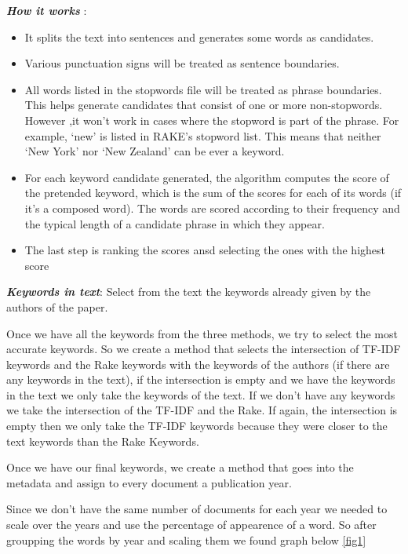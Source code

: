 \documentclass[article,twocolumn]{IEEEtran}
\providecommand{\tightlist}{%
      \setlength{\itemsep}{0pt}\setlength{\parskip}{0pt}}
\begin{document}
\textbf{\emph{How it works}} :

\begin{itemize}
\tightlist
\item
  It splits the text into sentences and generates some words as
  candidates.\\
\item
  Various punctuation signs will be treated as sentence boundaries.
\item
  All words listed in the stopwords file will be treated as phrase
  boundaries. This helps generate candidates that consist of one or more
  non-stopwords. However ,it won't work in cases where the stopword is
  part of the phrase. For example, `new' is listed in RAKE's stopword
  list. This means that neither `New York' nor `New Zealand' can be ever
  a keyword.
\item
  For each keyword candidate generated, the algorithm computes the score
  of the pretended keyword, which is the sum of the scores for each of
  its words (if it's a composed word). The words are scored according to
  their frequency and the typical length of a candidate phrase in which
  they appear.
\item
  The last step is ranking the scores ansd selecting the ones with the
  highest score
\end{itemize}

    \textbf{\emph{Keywords in text}}: Select from the text the keywords
already given by the authors of the paper.

    Once we have all the keywords from the three methods, we try to select
the most accurate keywords. So we create a method that selects the
intersection of TF-IDF keywords and the Rake keywords with the keywords
of the authors (if there are any keywords in the text), if the
intersection is empty and we have the keywords in the text we only take
the keywords of the text. If we don't have any keywords we take the
intersection of the TF-IDF and the Rake. If again, the intersection is
empty then we only take the TF-IDF keywords because they were closer to
the text keywords than the Rake Keywords.

    Once we have our final keywords, we create a method that goes into the
metadata and assign to every document a publication year.


    Since we don't have the same number of documents for each year we needed
to scale over the years and use the percentage of appearence of a word.
So after groupping the words by year and scaling them we found graph
below \ref{fig1}
\end{document}
